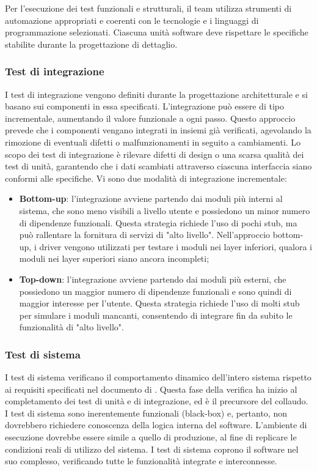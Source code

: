 \vspace{0.5\baselineskip}
\par Per l'esecuzione dei test funzionali e strutturali, il team utilizza strumenti di automazione appropriati e coerenti con le tecnologie e i linguaggi di programmazione selezionati. Ciascuna unità software deve rispettare le specifiche stabilite durante la progettazione di dettaglio.

\subsubsection{Test di integrazione}
\par I test di integrazione vengono definiti durante la progettazione architetturale e si basano sui componenti in essa specificati. L’integrazione può essere di tipo incrementale, aumentando il valore funzionale a ogni passo. Questo approccio prevede che i componenti vengano integrati in insiemi già verificati, agevolando la rimozione di eventuali difetti o malfunzionamenti in seguito a cambiamenti. Lo scopo dei test di integrazione è rilevare difetti di design o una scarsa qualità dei test di unità, garantendo che i dati scambiati attraverso ciascuna interfaccia siano conformi alle specifiche. Vi sono due modalità di integrazione incrementale:
\begin{itemize}
  \item \textbf{Bottom-up}: l’integrazione avviene partendo dai moduli più interni al sistema, che sono meno visibili a livello utente e possiedono un minor numero di dipendenze funzionali. Questa strategia richiede l’uso di pochi stub, ma può rallentare la fornitura di servizi di "alto livello". Nell’approccio bottom-up, i driver vengono utilizzati per testare i moduli nei layer inferiori, qualora i moduli nei layer superiori siano ancora incompleti;
  \item \textbf{Top-down}: l’integrazione avviene partendo dai moduli più esterni, che possiedono un maggior numero di dipendenze funzionali e sono quindi di maggior interesse per l’utente. Questa strategia richiede l'uso di molti stub per simulare i moduli mancanti, consentendo di integrare fin da subito le funzionalità di "alto livello".
\end{itemize}

\subsubsection{Test di sistema}
\par I test di sistema verificano il comportamento dinamico dell'intero sistema rispetto ai requisiti specificati nel documento di \AnalisiDeiRequisiti. Questa fase della verifica ha inizio al completamento dei test di unità e di integrazione, ed è il precursore del collaudo. I test di sistema sono inerentemente funzionali (black-box) e, pertanto, non dovrebbero richiedere conoscenza della logica interna del software. L’ambiente di esecuzione dovrebbe essere simile a quello di produzione, al fine di replicare le condizioni reali di utilizzo del sistema. I test di sistema coprono il software nel suo complesso, verificando tutte le funzionalità integrate e interconnesse.

